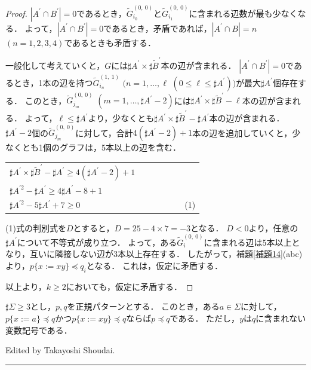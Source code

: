 \begin{proof}
$| A^{\prime} \cap B^{\prime} |=0$であるとき，$\tilde{G}^{(0,~0)}_{i_{0}}$と$\tilde{G}^{(0,~0)}_{i_{1}}$に含まれる辺数が最も少なくなる．
よって，$| A^{\prime} \cap B^{\prime} |=0$であるとき，矛盾であれば，$| A^{\prime} \cap B |=n$ $(n=1,2,3,4)$であるときも矛盾する．

一般化して考えていくと，$G$には$\sharp A^{\prime} \times \sharp\tilde{B}^{\prime}$本の辺が含まれる．
$| A^{\prime} \cap B^{\prime} |=0$であるとき，1本の辺を持つ$\tilde{G}^{(1,~1)}_{i_{n}}$ $(n=1,\ldots, \ell$ $(0 \le \ell \le \sharp A^{\prime}))$が最大$\sharp A^{\prime}$個存在する．
このとき，$\tilde{G}^{(0,~0)}_{j_{m}}$ $(m=1,\ldots, \sharp A^{\prime}-2)$には$\sharp A^{\prime} \times \sharp\tilde{B}^{\prime} - \ell$本の辺が含まれる．
よって，$\ell \le \sharp A^{\prime}$より，少なくとも$\sharp A^{\prime} \times \sharp\tilde{B}^{\prime} - \sharp A^{\prime}$本の辺が含まれる．
$\sharp A^{\prime}-2$個の$\tilde{G}^{(0,~0)}_{j_{m}}$に対して，合計$4(\sharp A^{\prime}-2) +1$本の辺を追加していくと，少なくとも1個のグラフは，5本以上の辺を含む．

\begin{center}
  \begin{tabular}{l}
  $\sharp A^{\prime} \times \sharp\tilde{B}^{\prime} -\sharp A^{\prime} \ge 4(\sharp A^{\prime}-2)+1$\\
  $\sharp A^{\prime 2}-\sharp A^{\prime} \ge 4\sharp A^{\prime}-8+1$\\
  $\sharp A^{\prime 2}-5\sharp A^{\prime}+7 \ge 0$~~~~~~~~~~~~~~~~~~~~~~~~~(1)
\end{tabular}
\end{center}


(1)式の判別式を$D$とすると，$D=25-4\times7=-3$となる．
$D<0$より，任意の$\sharp A^{\prime}$について不等式が成り立つ．
よって，ある$\tilde{G}^{(0,~0)}_{i}$に含まれる辺は5本以上となり，互いに隣接しない辺が3本以上存在する．
したがって，補題\ref{補題14}(abc)より，$p \{x:=xy \} \preceq q_{i}$となる．
これは，仮定に矛盾する．  

以上より，$k \ge 2$においても，仮定に矛盾する．
\end{proof}

\begin{lem}\label{補題15}
$\sharp \Sigma \ge 3$とし，$p,q$を正規パターンとする．
このとき，ある$a \in \Sigma$に対して，
$p \{ x := a \} \preceq q$かつ$p \{ x := xy \} \preceq q$ならば$p \preceq q$である．
ただし，$y$は$q$に含まれない変数記号である．
\end{lem}

\hfill Edited by Takayoshi Shoudai.
\hrule
\bigskip

%

